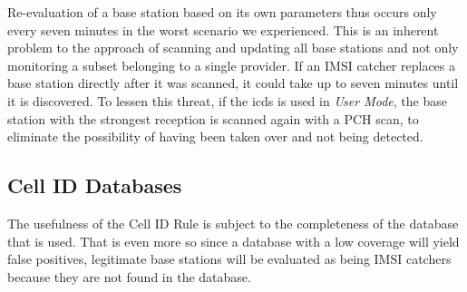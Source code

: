 Re-evaluation of a base station based on its own parameters thus occurs only every seven minutes in the worst scenario we experienced.
This is an inherent problem to the approach of scanning and updating all base stations and not only monitoring a subset belonging to a single provider.
If an IMSI catcher replaces a base station directly after it was scanned, it could take up to seven minutes until it is discovered.
To lessen this threat, if the \gls{icds} is used in \emph{User Mode}, the base station with the strongest reception is scanned again with a PCH scan, to eliminate the possibility of having been taken over and not being detected.

\subsection{Cell ID Databases}
The usefulness of the Cell ID Rule is subject to the completeness of the database that is used.
That is even more so since a database with a low coverage will yield false positives, \eg legitimate base stations will be evaluated as being IMSI catchers because they are not found in the database.

